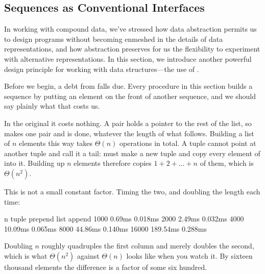 \subsection{Sequences as Conventional Interfaces}
\label{Section 2.2.3}

In working with compound data, we've stressed how data abstraction permits us
to design programs without becoming enmeshed in the details of data
representations, and how abstraction preserves for us the flexibility to
experiment with alternative representations.  In this section, we introduce
another powerful design principle for working with data structures---the use of
.

\begin{notTaste}
Before we begin, a debt from  falls due.  Every procedure
in this section builds a sequence by putting an element on the front of another
sequence, and we should say plainly what that costs us.

In the original it costs nothing.  A pair holds a pointer to the rest of the
list, so  makes one pair and is done, whatever the length of what
follows.  Building a list of \( n \) elements this way takes \( \Theta(n) \)
operations in total.  A tuple cannot point at another tuple and call it a tail:
 must make a new tuple and copy every element of 
into it.  Building up \( n \) elements therefore copies \( 1 + 2 + \dots + n \)
of them, which is \( \Theta(n^2) \).

This is not a small constant factor.  Timing the two, and doubling the length
each time:

\begin{codeBlock}
      n   tuple prepend   list append
   1000          0.69ms       0.018ms
   2000          2.49ms       0.032ms
   4000         10.09ms       0.065ms
   8000         44.86ms       0.140ms
  16000        189.54ms       0.288ms
\end{codeBlock}

\noindent
Doubling \( n \) roughly quadruples the first column and merely doubles the
second, which is what \( \Theta(n^2) \) against \( \Theta(n) \) looks like when
you watch it.  By sixteen thousand elements the difference is a factor of some
six hundred.


\end{notTaste}
